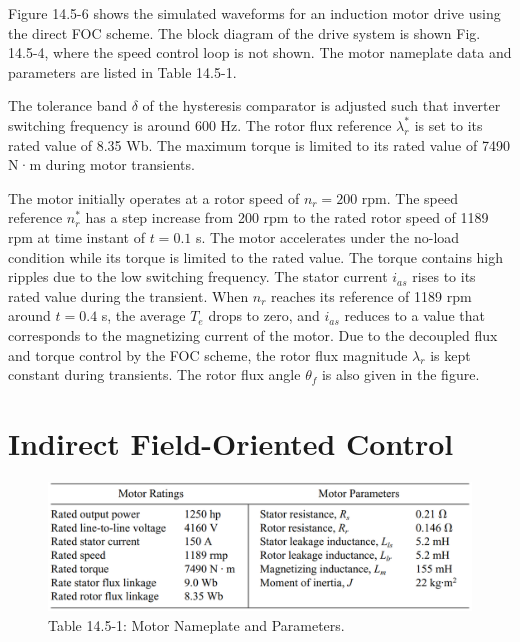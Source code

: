 \documentclass[letterpaper,12pt]{article}
\begin{document}
Figure 14.5-6 shows the simulated waveforms for an induction motor drive using the direct FOC scheme. The block diagram of the drive system is shown Fig. 14.5-4, where the speed control loop is not shown. The motor nameplate data and parameters are listed in Table 14.5-1.

The tolerance band $\delta$ of the hysteresis comparator is adjusted such that inverter switching frequency is around 600 Hz. The rotor flux reference $\lambda_r^*$ is set to its rated value of 8.35 Wb. The maximum torque is limited to its rated value of 7490 N·m during motor transients.

The motor initially operates at a rotor speed of $n_r = 200$ rpm. The speed reference $n_r^*$ has a step increase from 200 rpm to the rated rotor speed of 1189 rpm at time instant of $t = 0.1$ s. The motor accelerates under the no-load condition while its torque is limited to the rated value. The torque contains high ripples due to the low switching frequency. The stator current $i_{as}$ rises to its rated value during the transient. When $n_r$ reaches its reference of 1189 rpm around $t = 0.4$ s, the average $T_e$ drops to zero, and $i_{as}$ reduces to a value that corresponds to the magnetizing current of the motor. Due to the decoupled flux and torque control by the FOC scheme, the rotor flux magnitude $\lambda_r$ is kept constant during transients. The rotor flux angle $\theta_f$ is also given in the figure.

\section{Indirect Field-Oriented Control}

\begin{figure}[h]
\centering
\caption{Table 14.5-1: Motor Nameplate and Parameters.}
\includegraphics[scale=0.4]{graficos/tabla_14_5_1.png}
\end{figure}
\FloatBarrier
\end{document}
